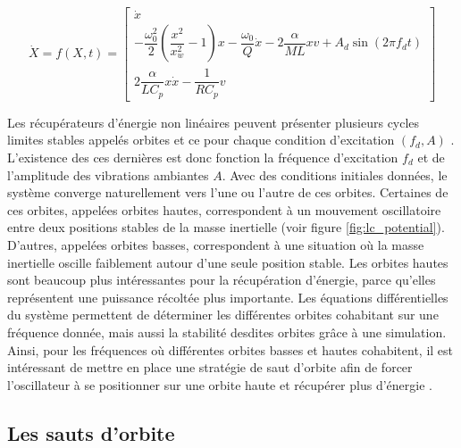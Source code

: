 \documentclass[a4paper, french, 12pt, titlepage]{article}
\begin{document}
\begin{equation}
  \dot X = f(X, t)
  =
  \begin{bmatrix}
    \dot x                                                                                                                                                       \\
    -\dfrac{\omega_0^2}{2} \left( \dfrac{x^2}{x_w^2} - 1 \right) x - \dfrac{\omega_0}{Q} \dot{x} - 2 \dfrac{\alpha}{M L} x v + A_d \sin \left(2 \pi f_d t\right) \\
    2 \dfrac{\alpha}{LC_p} x \dot{x} - \dfrac{1}{R C_p} v
  \end{bmatrix}
  \label{eq:ode2}
\end{equation}

\noindent Les récupérateurs d'énergie non linéaires peuvent présenter plusieurs cycles limites stables appelés orbites et ce pour chaque condition d'excitation $(f_d, A)$ .
L'existence des ces dernières est donc fonction la fréquence d'excitation $f_d$ et de l'amplitude des vibrations ambiantes $A$.
Avec des conditions initiales données, le système converge naturellement vers l'une ou l'autre de ces orbites.
Certaines de ces orbites, appelées orbites hautes, correspondent à un mouvement oscillatoire entre deux positions stables de la masse inertielle (voir figure \ref{fig:lc_potential}).
D'autres, appelées orbites basses, correspondent à une situation où la masse inertielle oscille faiblement autour d'une seule position stable.
Les orbites hautes sont beaucoup plus intéressantes pour la récupération d'énergie, parce qu'elles représentent une puissance récoltée plus importante.
Les équations différentielles du système permettent de déterminer les différentes orbites cohabitant sur une fréquence donnée, mais aussi la stabilité desdites orbites grâce à une simulation.
Ainsi, pour les fréquences où différentes orbites basses et hautes cohabitent, il est intéressant de mettre en place une stratégie de saut d'orbite afin de forcer l'oscillateur à se positionner sur une orbite haute et récupérer plus d'énergie \cite{saint2022power}.






\subsection{Les sauts d'orbite}
\end{document}
